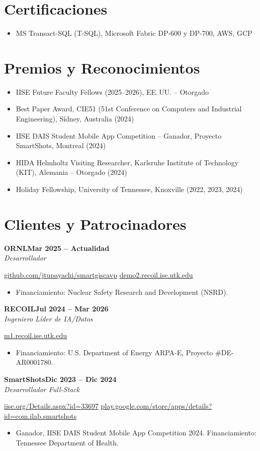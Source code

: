 \documentclass[10pt,letterpaper]{article}
\newcommand{\entrynoloc}[3]{%
  \vspace{3pt}\noindent\textbf{#1}\hfill\textbf{#2}\\[-1pt]
  \noindent\textit{#3}\par\vspace{1pt}}
\begin{document}
\section{Certificaciones}
\begin{itemize}\item MS Transact-SQL (T-SQL), Microsoft Fabric DP-600 y DP-700, AWS, GCP\end{itemize}

\section{Premios y Reconocimientos}
\begin{itemize}
\item IISE Future Faculty Fellows (2025--2026), EE.\,UU. -- Otorgado
\item Best Paper Award, CIE51 (51st Conference on Computers and Industrial Engineering), Sídney, Australia (2024)
\item IISE DAIS Student Mobile App Competition -- Ganador, Proyecto SmartShots, Montreal (2024)
\item HIDA Helmholtz Visiting Researcher, Karlsruhe Institute of Technology (KIT), Alemania -- Otorgado (2024)
\item Holiday Fellowship, University of Tennessee, Knoxville (2022, 2023, 2024)
\end{itemize}

\section{Clientes y Patrocinadores}
\entrynoloc{ORNL}{Mar 2025 -- Actualidad}{Desarrollador}
{\small \url{github.com/jtupayachi/smartgiscavp} \quad \url{demo2.recoil.ise.utk.edu}}
\begin{itemize}\item Financiamiento: Nuclear Safety Research and Development (NSRD).\end{itemize}

\entrynoloc{RECOIL}{Jul 2024 -- Mar 2026}{Ingeniero Líder de IA/Datos}
{\small \url{m1.recoil.ise.utk.edu}}
\begin{itemize}\item Financiamiento: U.S. Department of Energy ARPA-E, Proyecto \#DE-AR0001780.\end{itemize}

\entrynoloc{SmartShots}{Dic 2023 -- Dic 2024}{Desarrollador Full-Stack}
{\small \url{iise.org/Details.aspx?id=33697} \quad \url{play.google.com/store/apps/details?id=com.ilab.smartshots}}
\begin{itemize}\item Ganador, IISE DAIS Student Mobile App Competition 2024. Financiamiento: Tennessee Department of Health.\end{itemize}
\end{document}
